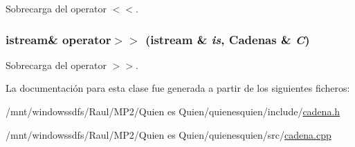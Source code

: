 Sobrecarga del operator $<$$<$. 

\hypertarget{class_cadenas_e0eb1eebcfce000da1a5084b76a8d11a}{
\subsubsection[{operator$>$$>$}]{\setlength{\rightskip}{0pt plus 5cm}istream\& operator$>$$>$ (istream \& {\em is}, \/  {\bf Cadenas} \& {\em C})}}
\label{class_cadenas_e0eb1eebcfce000da1a5084b76a8d11a}


Sobrecarga del operator $>$$>$. 



La documentación para esta clase fue generada a partir de los siguientes ficheros:\begin{CompactItemize}
\item 
/mnt/windowssdfs/Raul/MP2/Quien es Quien/quienesquien/include/\hyperlink{cadena_8h}{cadena.h}\item 
/mnt/windowssdfs/Raul/MP2/Quien es Quien/quienesquien/src/\hyperlink{cadena_8cpp}{cadena.cpp}\end{CompactItemize}
